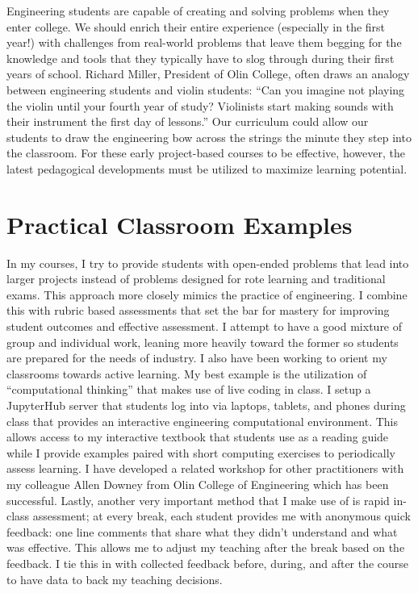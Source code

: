 \documentclass{article}
\begin{document}
Engineering students are capable of creating and solving problems when they
enter college. We should enrich their entire experience (especially in the first
year!) with challenges from real-world problems that leave them begging for the
knowledge and tools that they typically have to slog through during their first
years of school. Richard Miller, President of Olin College, often draws an
analogy between engineering students and violin students: ``Can you imagine not
playing the violin until your fourth year of study? Violinists start making
sounds with their instrument the first day of lessons.'' Our curriculum could
allow our students to draw the engineering bow across the strings the minute
they step into the classroom. For these early project-based courses to be
effective, however, the latest pedagogical developments must be utilized to
maximize learning potential.

\section*{Practical Classroom Examples}
%
In my courses, I try to provide students with open-ended problems that
lead into larger projects instead of problems designed for rote learning and
traditional exams. This approach more closely mimics the practice of
engineering. I combine this with rubric based assessments that set the bar for
mastery for improving student outcomes and effective assessment. I attempt to
have a good mixture of group and individual work, leaning more heavily toward
the former so students are prepared for the needs of industry. I also have been
working to orient my classrooms towards active learning. My best example is the
utilization of ``computational thinking'' that makes use of live coding in
class. I setup a JupyterHub server that students log into via laptops,
tablets, and phones during class that provides an interactive engineering
computational environment. This allows access to my interactive textbook that
students use as a reading guide while I provide examples paired with short
computing exercises to periodically assess learning. I have developed a related
workshop for other practitioners with my colleague Allen Downey from Olin
College of Engineering which has been successful. Lastly, another very
important method that I make use of is rapid in-class assessment; at every
break, each student provides me with anonymous quick feedback: one line
comments that share what they didn't understand and what was effective.  This
allows me to adjust my teaching after the break based on the feedback. I tie
this in with collected feedback before, during, and after the course to have
data to back my teaching decisions.
\end{document}
